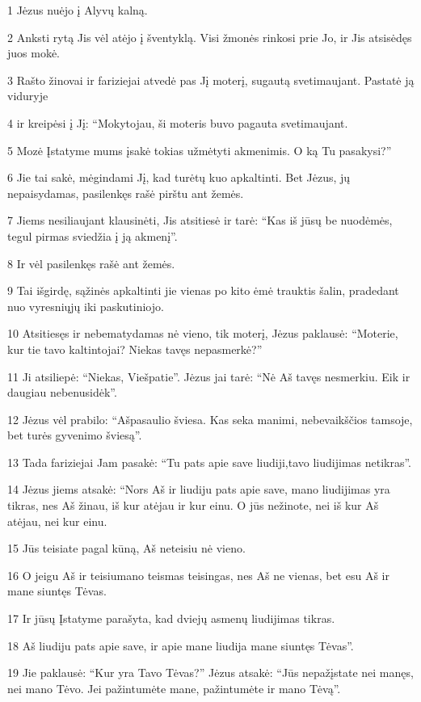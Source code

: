 \par 1 Jėzus nuėjo į Alyvų kalną. 
\par 2 Anksti rytą Jis vėl atėjo į šventyklą. Visi žmonės rinkosi prie Jo, ir Jis atsisėdęs juos mokė. 
\par 3 Rašto žinovai ir fariziejai atvedė pas Jį moterį, sugautą svetimaujant. Pastatė ją viduryje 
\par 4 ir kreipėsi į Jį: “Mokytojau, ši moteris buvo pagauta svetimaujant. 
\par 5 Mozė Įstatyme mums įsakė tokias užmėtyti akmenimis. O ką Tu pasakysi?” 
\par 6 Jie tai sakė, mėgindami Jį, kad turėtų kuo apkaltinti. Bet Jėzus, jų nepaisydamas, pasilenkęs rašė pirštu ant žemės. 
\par 7 Jiems nesiliaujant klausinėti, Jis atsitiesė ir tarė: “Kas iš jūsų be nuodėmės, tegul pirmas sviedžia į ją akmenį”. 
\par 8 Ir vėl pasilenkęs rašė ant žemės. 
\par 9 Tai išgirdę, sąžinės apkaltinti jie vienas po kito ėmė trauktis šalin, pradedant nuo vyresniųjų iki paskutiniojo. 
\par 10 Atsitiesęs ir nebematydamas nė vieno, tik moterį, Jėzus paklausė: “Moterie, kur tie tavo kaltintojai? Niekas tavęs nepasmerkė?” 
\par 11 Ji atsiliepė: “Niekas, Viešpatie”. Jėzus jai tarė: “Nė Aš tavęs nesmerkiu. Eik ir daugiau nebenusidėk”. 
\par 12 Jėzus vėl prabilo: “Aš­pasaulio šviesa. Kas seka manimi, nebevaikščios tamsoje, bet turės gyvenimo šviesą”. 
\par 13 Tada fariziejai Jam pasakė: “Tu pats apie save liudiji,­tavo liudijimas netikras”. 
\par 14 Jėzus jiems atsakė: “Nors Aš ir liudiju pats apie save, mano liudijimas yra tikras, nes Aš žinau, iš kur atėjau ir kur einu. O jūs nežinote, nei iš kur Aš atėjau, nei kur einu. 
\par 15 Jūs teisiate pagal kūną, Aš neteisiu nė vieno. 
\par 16 O jeigu Aš ir teisiu­mano teismas teisingas, nes Aš ne vienas, bet esu Aš ir mane siuntęs Tėvas. 
\par 17 Ir jūsų Įstatyme parašyta, kad dviejų asmenų liudijimas tikras. 
\par 18 Aš liudiju pats apie save, ir apie mane liudija mane siuntęs Tėvas”. 
\par 19 Jie paklausė: “Kur yra Tavo Tėvas?” Jėzus atsakė: “Jūs nepažįstate nei manęs, nei mano Tėvo. Jei pažintumėte mane, pažintumėte ir mano Tėvą”. 

